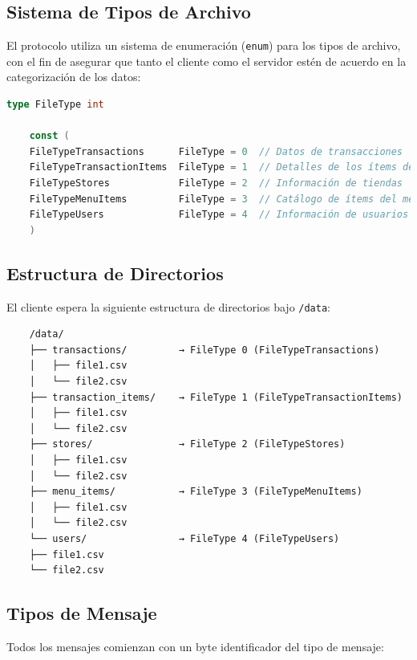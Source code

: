 \documentclass[titlepage,a4paper]{article}
\begin{document}
\subsection{Sistema de Tipos de Archivo}

El protocolo utiliza un sistema de enumeración (\texttt{enum}) para los tipos de archivo, con el fin de asegurar que tanto el cliente como el servidor estén de acuerdo en la categorización de los datos:

\begin{lstlisting}[language=Go]
	type FileType int
	
	const (
	FileTypeTransactions      FileType = 0  // Datos de transacciones
	FileTypeTransactionItems  FileType = 1  // Detalles de los ítems de transacción
	FileTypeStores            FileType = 2  // Información de tiendas
	FileTypeMenuItems         FileType = 3  // Catálogo de ítems del menú
	FileTypeUsers             FileType = 4  // Información de usuarios
	)
\end{lstlisting}

\subsection*{Estructura de Directorios}

El cliente espera la siguiente estructura de directorios bajo \texttt{/data}:

\begin{lstlisting}
	/data/
	├── transactions/         → FileType 0 (FileTypeTransactions)
	│   ├── file1.csv
	│   └── file2.csv
	├── transaction_items/    → FileType 1 (FileTypeTransactionItems)
	│   ├── file1.csv
	│   └── file2.csv
	├── stores/               → FileType 2 (FileTypeStores)
	│   ├── file1.csv
	│   └── file2.csv
	├── menu_items/           → FileType 3 (FileTypeMenuItems)
	│   ├── file1.csv
	│   └── file2.csv
	└── users/                → FileType 4 (FileTypeUsers)
	├── file1.csv
	└── file2.csv
\end{lstlisting}

\subsection{Tipos de Mensaje}

Todos los mensajes comienzan con un byte identificador del tipo de mensaje:
\end{document}
